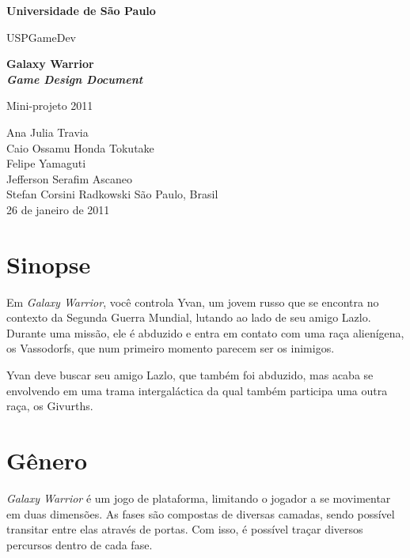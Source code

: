 \documentclass[12pt, a4paper]{article}
\begin{document}
\thispagestyle{empty}
    \begin{center}
        \textbf{\LARGE{Universidade de São Paulo}}
        \vspace*{0.5 cm}

        {\LARGE{USPGameDev}}
        
        \vspace*{3.0 cm}
        \textbf{\large{Galaxy Warrior\\
                \emph{Game Design Document}}}
    \end{center}

    \vskip 3cm

    \begin{flushright}
        Mini-projeto 2011

        \vskip 3cm

    \end{flushright}
    \vskip 3.5cm

    \begin{center}
        Ana Julia Travia\\
        Caio Ossamu Honda Tokutake\\
        Felipe Yamaguti\\
        Jefferson Serafim Ascaneo\\
        Stefan Corsini Radkowski
        \vskip 1cm
        São Paulo, Brasil\\
        26 de janeiro de 2011
    \end{center}
\pagebreak

\tableofcontents
\pagebreak

\section{Sinopse}
    Em \emph{Galaxy Warrior}, você controla Yvan, um jovem russo que se encontra
    no contexto da Segunda Guerra Mundial, lutando ao lado de seu amigo Lazlo.
    Durante uma missão, ele é abduzido e entra em contato com uma raça alienígena,
    os Vassodorfs, que num primeiro momento parecem ser os inimigos.
    
    Yvan deve buscar seu amigo Lazlo, que também foi abduzido, mas acaba se 
    envolvendo em uma trama intergaláctica da qual também participa uma outra 
    raça, os Givurths. 

\section{Gênero}
    \emph{Galaxy Warrior} é um jogo de plataforma, limitando o jogador a se movimentar
    em duas dimensões. As fases são compostas de diversas camadas, sendo possível
    transitar entre elas através de portas. Com isso, é possível traçar diversos 
    percursos dentro de cada fase.
    
\end{document}
